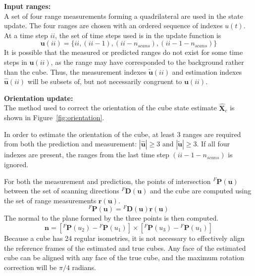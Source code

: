 		\textbf{Input ranges:}\\
			A set of four range measurements forming a quadrilateral are used in the state update. The four ranges are chosen with an ordered sequence of indexes $u(t)$. At a time step $ii$, the set of time steps used is in the update function is
			\begin{equation}
				\mathbf{u}(ii) = \{ii,(ii-1),(ii-n_{scans}),(ii-1-n_{scans})\}
			\end{equation}
			It is possible that the measured or predicted ranges do not exist for some time steps in $\mathbf{u}(ii)$, as the range may have corresponded to the background rather than the cube.
			Thus, the measurement indexes $\tilde{\mathbf{u}}(ii)$ and estimation indexes $\hat{\mathbf{u}}(ii)$ will be subsets of, but not necessarily congruent to $\mathbf{u}(ii)$.
			
		\textbf{Orientation update:}\\

			The method used to correct the orientation of the cube state estimate $\hat{\mathbf{X}}_c$ is shown in Figure~\ref{fig:orientation}. 
						
			In order to estimate the orientation of the cube, at least 3 ranges are required from both the prediction and measurement:
			$|\hat{\mathbf{u}}| \geq 3$ and $|\tilde{\mathbf{u}}| \geq 3$. If all four indexes are present, the ranges from the last time step $(ii-1-n_{scans})$ is ignored.
	
			For both the measurement and prediction, the points of intersection $^{F}\mathbf{P}(\mathbf{u})$ between the set of scanning directions ${^{F}\mathbf{D}(\mathbf{u})}$ and the cube are computed using the set of range measurements $\mathbf{r}(\mathbf{u})$.
			\begin{equation} \label{eq:points}
				^{F}\mathbf{P}(\mathbf{u}) = {^{F}\mathbf{D}(\mathbf{u})}\mathbf{r}(\mathbf{u})
			\end{equation}
			The normal to the plane formed by the three points is then computed.
			\begin{equation}
				\mathbf{n} = [{^{F}\mathbf{P}}(u_2) - {^{F}\mathbf{P}}(u_1)] \times [{^{F}\mathbf{P}}(u_3) - {^{F}\mathbf{P}}(u_1)]
			\end{equation}
			Because a cube has 24 regular isometries, it is not necessary to effectively align the reference frames of the estimated and true cubes. Any face of the estimated cube can be aligned with any face of the true cube, and the maximum rotation correction will be $\pi/4$ radians.

